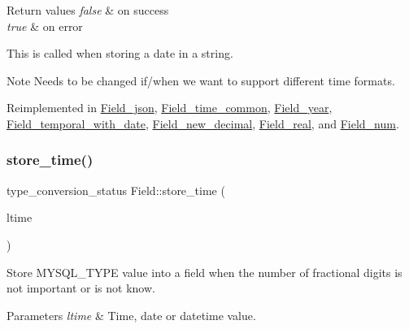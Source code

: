 \begin{DoxyRetVals}{Return values}
{\em false} & on success \\
\hline
{\em true} & on error\\
\hline
\end{DoxyRetVals}
This is called when storing a date in a string.

\begin{DoxyNote}{Note}
Needs to be changed if/when we want to support different time formats. 
\end{DoxyNote}


Reimplemented in \mbox{\hyperlink{classField__json_a5731d3f5f045aa66468f6f9242c920a0}{Field\+\_\+json}}, \mbox{\hyperlink{classField__time__common_a679289fc41b3c0f5bf4f20a31d0e67d3}{Field\+\_\+time\+\_\+common}}, \mbox{\hyperlink{classField__year_a20cfacc8efbe8c12137deea34c287be0}{Field\+\_\+year}}, \mbox{\hyperlink{classField__temporal__with__date_aa93167bb62fc7b8e0428ef1e3baaaf7c}{Field\+\_\+temporal\+\_\+with\+\_\+date}}, \mbox{\hyperlink{classField__new__decimal_ab6f4b13ae308695dffd15cb0c39038d0}{Field\+\_\+new\+\_\+decimal}}, \mbox{\hyperlink{classField__real_a2020c5eabc8cdc2c451ca0591e284150}{Field\+\_\+real}}, and \mbox{\hyperlink{classField__num_ab573b6e30982c3d517794503f14560de}{Field\+\_\+num}}.

\mbox{\label{classField_a2c0631841b33f2912380400afe77daa8}} 
\subsubsection{\texorpdfstring{store\+\_\+time()}{store\_time()}\hspace{0.1cm}{\footnotesize\ttfamily [2/2]}}
{\footnotesize\ttfamily type\+\_\+conversion\+\_\+status Field\+::store\+\_\+time (\begin{DoxyParamCaption}\item[{M\+Y\+S\+Q\+L\+\_\+\+T\+I\+ME $\ast$}]{ltime }\end{DoxyParamCaption})\hspace{0.3cm}{\ttfamily [inline]}}

Store M\+Y\+S\+Q\+L\+\_\+\+T\+Y\+PE value into a field when the number of fractional digits is not important or is not know.


\begin{DoxyParams}{Parameters}
{\em ltime} & Time, date or datetime value. \\
\hline
\end{DoxyParams}

